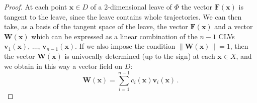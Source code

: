 \documentclass[10pt,a4paper]{amsart}
\newcommand{\vect}[1]{\boldsymbol{#1}}
\begin{document}
\begin{proof}
At each point $\vect{x}\in D$ of a 2-dimensional leave 
of $\Phi$ the vector $\vect{F}(\vect{x})$ is tangent to the leave, 
since the leave contains whole trajectories. We can then take,
as a  basis of the tangent space of the leave, the vector
$\vect{F}(\vect{x})$ and a vector $\vect{W}(\vect{x})$ which can be
  expressed as a linear combination of the $n-1$ CLVs 
$\vect{v}_1(\vect{x})$, $\dots$,  $\vect{v}_{n-1}(\vect{x})$.
If we also impose the condition
$\lVert \vect{W}(\vect{x})\rVert =1$, then the vector $\vect{W}
(\vect{x})$ is univocally determined (up to the sign)
at each $\vect{x}\in X$, and we
obtain in this way a vector field on $D$:
  \begin{equation} \label{eq:geo:def:W}
    \vect{W}(\vect{x}) = \sum_{i=1}^{n-1} c_i (\vect{x})
\vect{v}_i (\vect{x})\,.
  \end{equation}
  

\end{proof}
\end{document}
